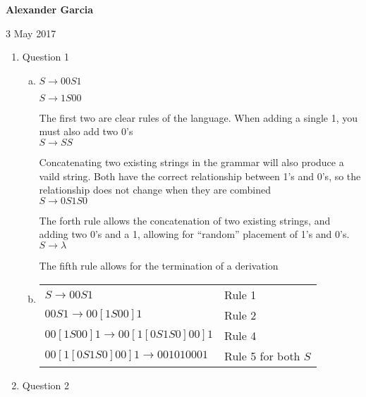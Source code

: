 \documentclass[11pt]{article}
\begin{document}
\textbf{Alexander Garcia}

3 May 2017

	\begin{enumerate}

			\item Question 1

				\begin{enumerate}[(a)]

					\item

						$S \rightarrow 00S1$

						$S \rightarrow 1S00$

						The first two are clear rules of the language. When adding a single 1,
						you must also add two 0's \\

						$S \rightarrow SS$

						Concatenating two existing strings in the grammar will also produce a vaild string.
						Both have the correct relationship between 1's and 0's, so the relationship does not
						change when they are combined \\


						$S \rightarrow 0S1S0$

						The forth rule allows the concatenation of two existing strings, and adding two 0's and a 1,
						allowing for ``random'' placement of 1's and 0's. \\


						$S \rightarrow \lambda$

						The fifth rule allows for the termination of a derivation \\

					\item 	\begin{tabular}{ll}

						$S \rightarrow 00S1$ & Rule 1 \\

						$00S1 \rightarrow 00[1S00]1$ & Rule 2 \\

						$00[1S00]1 \rightarrow 00[1[0S1S0]00]1$ & Rule 4 \\

						$00[1[0S1S0]00]1 \rightarrow 001010001$ & Rule 5 for both $S$ \\

					\end{tabular}

				\end{enumerate}

			\item Question 2

	\end{enumerate}
\end{document}
